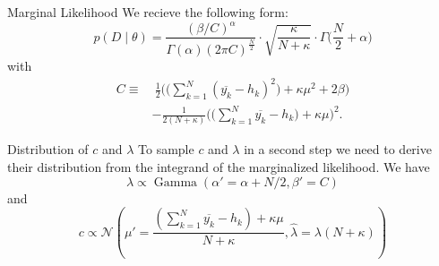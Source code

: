 \documentclass{beamer}
\newcommand{\R}{\mathbb{R}}
\begin{document}
  	

  	\begin{frame}{Marginal Likelihood}
  		We recieve the following form:
  		\[
  			p(D \mid \theta) = \frac{(\beta / C)^\alpha}{\Gamma(\alpha) 
  			(2\pi C)^{\frac{N}{2}}} \cdot \sqrt{\frac{\kappa}{N + \kappa}}
  			\cdot \Gamma \biggl(\frac{N}{2} + \alpha \biggr)
  		\]
  		with
  		\begin{align*}
  			C \equiv& \ \frac{1}{2}\Biggl( \Biggl( \sum_{k = 1}^N (\overline{y_k}
  			 - h_k)^2 \Biggr) + \kappa \mu^2 + 2\beta \Biggr) \\
  			 &-  \frac{1}{2(N + \kappa)} \Biggl(\Biggl(\sum_{k = 1}^N
  			 \overline{y_k} - h_k\Biggr)+ \kappa \mu \Biggr)^2.
  		\end{align*}
   	\end{frame}
   	
   	\begin{frame}{Distribution of $c$ and $\lambda$}
   		To sample $c$ and $\lambda$ in a second step we need to derive their 
   		distribution from the integrand of the marginalized likelihood. We have
   		\[
   			\lambda \propto \operatorname{Gamma}(\alpha' = \alpha + N/2, \beta' 
   			= C)
   		\]
		and
		\[
			c \propto \mathcal{N} \left(\mu' = \frac{\left(\sum_{k = 1}^N
			\overline{y_k}-h_k \right) + \kappa \mu }{N + \kappa}, \hat{\lambda}
			= \lambda (N + \kappa) \right)
		\]
   	\end{frame}
   	
\end{document}
